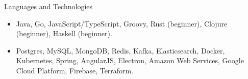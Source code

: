 \documentclass[]{cv}
\begin{document}
	\begin{cvsection}{Languages and Technologies}
		\begin{cvsubsection}{}{}{}	
			\begin{itemize}
				\item Java, Go, JavaScript/TypeScript, Groovy, Rust (beginner), Clojure (beginner), Haskell (beginner).
				\item Postgres, MySQL, MongoDB, Redis, Kafka, Elasticsearch, Docker, Kubernetes, Spring, AngularJS, Electron, Amazon Web Services, Google Cloud Platform, Firebase, Terraform.
			\end{itemize}
		\end{cvsubsection}
	\end{cvsection}
	
\end{document}
